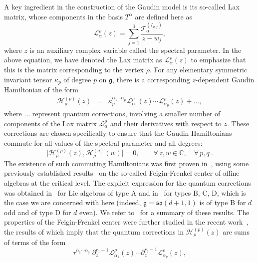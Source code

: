 \documentclass{article}
\def\g{\mathfrak{g}}
\def\Lc{\mathcal{L}}
\def\Hc{\mathcal{H}}
\begin{document}
A key ingredient in the construction of the Gaudin model is its so-called Lax matrix, whose 
components in the basis $T^\alpha$ are defined here as
\begin{equation}\label{eq:Lax3pt}
\Lc^\rho_\alpha(z) = \sum_{j=1}^3 \frac{\mathcal{T}_\alpha^{(I_{\rho,j})}}{z-w_j},
\end{equation}
where $z$ is an auxiliary complex variable called the spectral parameter. In the above equation, 
we have denoted the Lax matrix as $\Lc^\rho_\alpha(z)$ to emphasize that this is the matrix 
corresponding to the vertex $\rho$. For any elementary symmetric invariant tensor $\kappa_p$ 
of degree $p$ on $\g$, there is a corresponding $z$-dependent Gaudin Hamiltonian of the form
\begin{eqnarray}\label{eq:GaudinHam}
\Hc^{(p)}_\rho(z) & = & \kappa_p^{\alpha_1\cdots \alpha_p} \Lc_{\alpha_1}^\rho(z) \cdots 
\Lc_{\alpha_p}^\rho(z) + \dots,
\end{eqnarray}
where $\dots$ represent quantum corrections, involving a smaller number of components of the Lax 
matrix $\Lc_\alpha^\rho$ and their derivatives with respect to $z$. These corrections are chosen specifically to ensure that the Gaudin Hamiltonians commute for all values of the 
spectral parameter and all degrees:
\begin{equation}\label{eq:comH}
\bigl[ \Hc_\rho^{(p)}(z), \Hc_\rho^{(q)}(w) \bigr] = 0, \qquad \forall\, z,w\in\mathbb{C}, \quad  \forall\,p,q\ .
\end{equation}
The existence of such commuting Hamiltonians was first proven in~\cite{Feigin:1994in}, using some 
previously established results~\cite{Feigin:1991wy} on the so-called Feigin-Frenkel center of 
affine algebras at the critical level. The explicit expression for the quantum corrections was 
obtained in~\cite{Talalaev:2004qi,Chervov:2006xk} for Lie algebras of type A and in~\cite{Molev:2013} 
for types B, C, D, which is the case we are concerned with here (indeed, $\g=\mathfrak{so}(d+1,1)$ is 
of type B for $d$ odd and of type D for $d$ even). We refer to~\cite{Molev:2018} for a summary of
these results. The properties of the Feigin-Frenkel center were further studied in the recent 
work~\cite{Yakimova:2019}, the results of which imply that the quantum corrections in 
$\Hc^{(p)}_\rho(z)$ are sums of terms of the form
\begin{equation}\label{eq:Correc}
\tau^{\alpha_1\cdots \alpha_q} \; 
\partial_z^{r_1-1}\Lc^\rho_{\alpha_1}(z)\cdots\partial_z^{r_q-1}\Lc^\rho_{\alpha_q}(z),
\end{equation}
\end{document}
